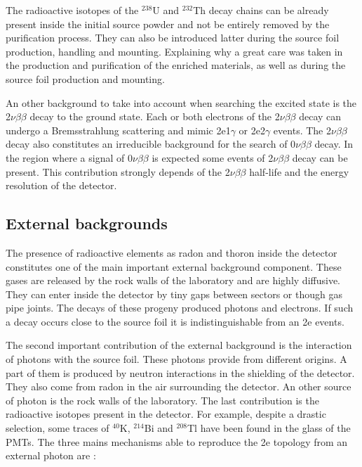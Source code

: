 \documentclass[main.tex]{subfiles}
\begin{document}
\NI The radioactive isotopes of the $^{\text{238}}$U and $^{\text{232}}$Th decay chains can be already present inside the initial source powder and not be entirely removed by the purification process. They can also be introduced latter during the source foil production, handling and mounting. Explaining why a great care was taken in the production and purification of the enriched materials, as well as during the source foil production and mounting.


\bigskip


\NI An other background to take into account when searching the excited state is the 2$\nu\beta\beta$ decay to the ground state. Each or both electrons of the 2$\nu\beta\beta$ decay can undergo a Bremsstrahlung scattering and mimic 2e1$\gamma$ or 2e2$\gamma$ events. The 2$\nu\beta\beta$ decay also constitutes an irreducible background for the search of 0$\nu\beta\beta$ decay. In the region where a signal of 0$\nu\beta\beta$ is expected some events of 2$\nu\beta\beta$ decay can be present. This contribution strongly depends of the 2$\nu\beta\beta$ half-life and the energy resolution of the detector.


\FloatBarrier


\subsection{External backgrounds}\label{sec:externalBkg}


\NI The presence of radioactive elements as radon and thoron inside the detector constitutes one of the main important external background component. These gases are released by the rock walls of the laboratory and are highly diffusive. They can enter inside the detector by tiny gaps between sectors or though gas pipe joints. The decays of these progeny produced photons and electrons. If such a decay occurs close to the source foil it is indistinguishable from an 2e events.


\bigskip


\NI The second important contribution of the external background is the interaction of photons with the source foil. These photons provide from different origins. A part of them is produced by neutron interactions in the shielding of the detector. They also come from radon in the air surrounding the detector. An other source of photon is the rock walls of the laboratory. The last contribution is the radioactive isotopes present in the detector. For example, despite a drastic selection, some traces of $^{\text{40}}$K, $^{\text{214}}$Bi and $^{\text{208}}$Tl have been found in the glass of the PMTs. The three mains mechanisms able to reproduce the 2e topology from an external photon are :   
\end{document}
